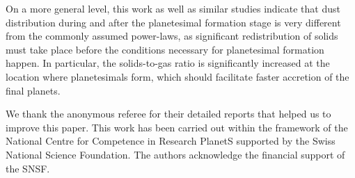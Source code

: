 \documentclass{aa}
\begin{document}
On a more general level, this work as well as similar studies \citep{2016A&A...594A.105D, 2017ApJ...839...16C, 2017MNRAS.467.1984G} indicate that dust distribution during and after the planetesimal formation stage is very different from the commonly assumed power-laws, as significant redistribution of solids must take place before the conditions necessary for planetesimal formation happen. In particular, the solids-to-gas ratio is significantly increased at the location where planetesimals form, which should facilitate faster accretion of the final planets.

\begin{acknowledgements}
     We thank the anonymous referee for their detailed reports that helped us to improve this paper. This work has been carried out within the framework of the National Centre for Competence in Research PlanetS supported by the Swiss National Science Foundation. The authors acknowledge the financial support of the SNSF.
\end{acknowledgements}


\end{document}

